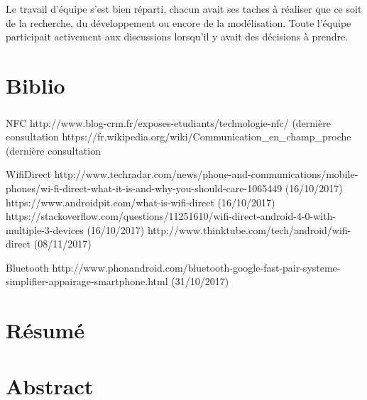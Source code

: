 \documentclass[a4paper,10pt]{report}
\begin{document}
Le travail d'équipe s'est bien réparti, chacun avait ses taches à réaliser que ce soit de la recherche, du développement ou encore de la modélisation. Toute l'équipe participait activement aux discussions lorsqu'il y avait des décisions à prendre.

\chapter*{Biblio}
 \paragraph{}
 NFC
 http://www.blog-crm.fr/exposes-etudiants/technologie-nfc/ (dernière consultation 
 https://fr.wikipedia.org/wiki/Communication_en_champ_proche (dernière consultation 
 
 WifiDirect
 http://www.techradar.com/news/phone-and-communications/mobile-phones/wi-fi-direct-what-it-is-and-why-you-should-care-1065449 (16/10/2017)
 https://www.androidpit.com/what-is-wifi-direct (16/10/2017)
 https://stackoverflow.com/questions/11251610/wifi-direct-android-4-0-with-multiple-3-devices (16/10/2017)
 http://www.thinktube.com/tech/android/wifi-direct (08/11/2017)
 
 Bluetooth
 http://www.phonandroid.com/bluetooth-google-fast-pair-systeme-simplifier-appairage-smartphone.html (31/10/2017)
 \chapter*{Résumé}
 \chapter*{Abstract}
\end{document}
